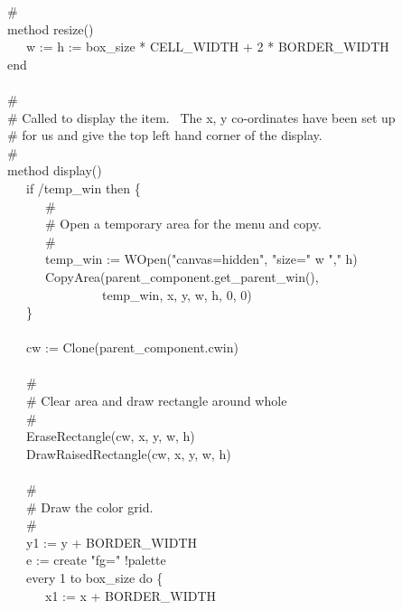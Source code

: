 {\>   \# \\
\>   method resize() \\
\>   \ \ \ w := h := box\_size * CELL\_WIDTH + 2 * BORDER\_WIDTH \\
\>   end \\
\ \\
\>   \# \\
\>   \# Called to display the item. \ The x, y co-ordinates have been set up \\
\>   \# for us and give the top left hand corner of the display.  \\
\>   \# \\
\>   method display() \\
\>   \ \ \ if /temp\_win then \{ \\
\>   \ \ \ \ \ \ \# \\
\>   \ \ \ \ \ \ \# Open a temporary area for the menu and copy. \\
\>   \ \ \ \ \ \ \# \\
\>   \ \ \ \ \ \ temp\_win :=
WOpen("canvas=hidden",
"size=" {\textbar}{\textbar} w
{\textbar}{\textbar} ","
{\textbar}{\textbar} h) \\
\>   \ \ \ \ \ \ CopyArea(parent\_component.get\_parent\_win(), \\
\>   \ \ \ \ \ \ \ \ \ \ \ \ \ \ \ temp\_win, x, y,
w, h, 0, 0) \\
\>   \ \ \ \} \\
\ \\
\>   \ \ \ cw := Clone(parent\_component.cwin) \\
\ \\
\>   \ \ \ \# \\
\>   \ \ \ \# Clear area and draw rectangle around whole \\
\>   \ \ \ \# \\
\>   \ \ \ EraseRectangle(cw, x, y, w, h) \\
\>   \ \ \ DrawRaisedRectangle(cw, x, y, w, h) \\
\ \\
\>   \ \ \ \# \\
\>   \ \ \ \# Draw the color grid. \\
\>   \ \ \ \# \\
\>   \ \ \ y1 := y + BORDER\_WIDTH \ \ \ \ \  \\
\>   \ \ \ e := create "fg="
{\textbar}{\textbar} !palette \\
\>   \ \ \ every 1 to box\_size do \{ \\
\>   \ \ \ \ \ \ x1 := x + BORDER\_WIDTH \  \\
}
